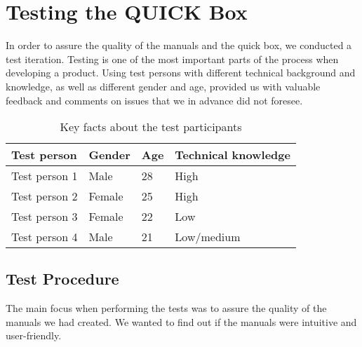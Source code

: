 \chapter{Testing the QUICK Box}
\label{chp:test} 

In order to assure the quality of the manuals and the \gls{quick} box, we conducted a test iteration. Testing is one of the most important parts of the process when developing a product. Using test persons with different technical background and knowledge, as well as different gender and age, provided us with valuable feedback and comments on issues that we in advance did not foresee. 

\begin{center}
\begin{table}[h!]
\caption{\label{tab:testpersons}Key facts about the test participants}
    \begin{tabular}{ | l | l | l | l |}
    \hline
    \textbf{Test person} & \textbf{Gender} & \textbf{Age} & \textbf{Technical knowledge} \\ 
    \hline
    Test person 1 &  Male & 28 & High\\ 
    \hline
    Test person 2 &  Female & 25 & High\\  
    \hline
    Test person 3 &  Female & 22 & Low\\  
    \hline
    Test person 4 &  Male & 21 & Low/medium\\  
    \hline
    \end{tabular}
   \end{table}
\end{center}


\section{Test Procedure}
The main focus when performing the tests was to assure the quality of the manuals we had created. We wanted to find out if the manuals were intuitive and user-friendly.

